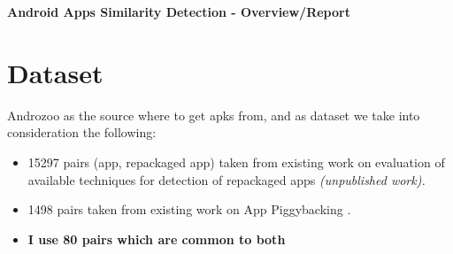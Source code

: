 \documentclass[16pt,letterpaper]{article}
\begin{document}
\textbf{\Large Android Apps Similarity Detection - Overview/Report}


\section{Dataset}

Androzoo \cite{Allix} as the source where to get apks from, and as dataset we take into consideration the following:
\begin{itemize}
    \item 15297 pairs (app, repackaged app) taken from existing work on evaluation of available techniques for detection of repackaged apps \cite{repackaged-dataset} \textit{(unpublished work).}
    \item 1498 pairs taken from existing work on App Piggybacking \cite{piggyback-paper,piggyback-dataset}.
    \item \textbf{I use 80 pairs which are common to both}
\end{itemize}




\printbibliography
\end{document}
